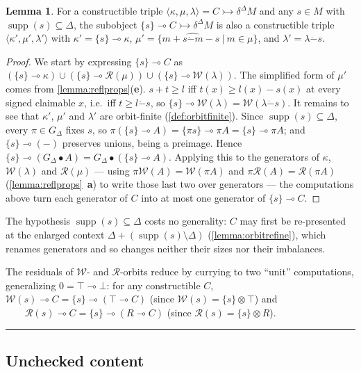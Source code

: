 \documentclass{article}
\theoremstyle{definition}
\newtheorem{lemma}{Lemma}[section]
\newcommand{\cR}{\mathcal{R}}
\newcommand{\cW}{\mathcal{W}}
\newcommand{\supp}{\operatorname{supp}}
\newcommand{\monus}{\mathbin{\dot-}}
\begin{document}
\begin{lemma}
    \label{lemma:reflresidual}
   For a constructible triple $\langle \kappa, \mu, \lambda \rangle = C \rightarrowtail \delta^\Delta M$ and any $s\in M$ with $\supp(s)\subseteq\Delta$, the subobject $\{s\}\multimap C \rightarrowtail \delta^\Delta M$ is also a constructible triple $\langle \kappa', \mu', \lambda' \rangle$ with $\kappa' = \{s\}\multimap \kappa$, $\mu' = \{m+\widehat{s\monus m}-s\ |\ m \in \mu\}$, and $\lambda' =\lambda\monus s$.
\end{lemma}
\begin{proof}

We start by expressing $\{s\}\multimap C$ as $(\{s\}\multimap \kappa) \cup (\{s\}\multimap \cR(\mu)) \cup (\{s\}\multimap \cW(\lambda))$.
The simplified form of $\mu'$ comes from \cref{lemma:reflprops}({\bf e}). $s+t\geq l$ iff $t(x)\geq l(x)-s(x)$ at every signed claimable $x$, i.e.\ iff $t\geq l\monus s$, so $\{s\}\multimap\cW(\lambda)=\cW(\lambda\monus s)$.
It remains to see that $\kappa'$, $\mu'$ and $\lambda'$ are orbit-finite (\cref{def:orbitfinite}). Since $\supp(s)\subseteq\Delta$, every $\pi\in G_\Delta$ fixes $s$, so $\pi(\{s\}\multimap A)=\{\pi s\}\multimap\pi A=\{s\}\multimap\pi A$; and $\{s\}\multimap(-)$ preserves unions, being a preimage. Hence $\{s\}\multimap(G_\Delta\bullet A)=G_\Delta\bullet(\{s\}\multimap A)$. Applying this to the generators of $\kappa$, $\cW(\lambda)$ and $\cR(\mu)$ --- using $\pi\cW(A)=\cW(\pi A)$ and $\pi\cR(A)=\cR(\pi A)$ (\cref{lemma:reflprops}~{\bf a}) to write those last two over generators --- the computations above turn each generator of $C$ into at most one generator of $\{s\}\multimap C$.
\end{proof}


The hypothesis $\supp(s)\subseteq\Delta$ costs no generality: $C$ may first be re-presented at the enlarged context $\Delta+(\supp(s)\setminus\Delta)$ (\cref{lemma:orbitrefine}), which renames generators and so changes neither their sizes nor their imbalances.

The residuals of $\cW$- and $\cR$-orbits reduce by currying to two ``unit'' computations, generalizing $0=\top\multimap\bot$: for any constructible $C$,
$\cW(s)\multimap C=\{s\}\multimap(\top\multimap C)$ (since $\cW(s)=\{s\}\otimes\top$) and $\qquad \cR(s)\multimap C=\{s\}\multimap(R\multimap C)$ (since $\cR(s)=\{s\}\otimes R$). 


\noindent\rule{\textwidth}{1pt}

\subsection{Unchecked content}
\end{document}
